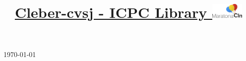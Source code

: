 \documentclass[10pt,a4paper]{article}
\title{\vspace{-5ex}\Large{\underline{
  Cleber-cvsj - ICPC Library
  \includegraphics[height=0.75cm]{maratona_cin.png} 
}}}
\author{}
\date{}
\begin{document}
\begin{landscape}
\begin{multicols*}{3}  %
\raggedcolumns 
{}

\maketitle
\vspace{-13ex}
{\tiny\today} \vspace{-3ex}
\tableofcontents
\pagestyle{fancy}



\end{multicols*}
\end{landscape}
\end{document}
